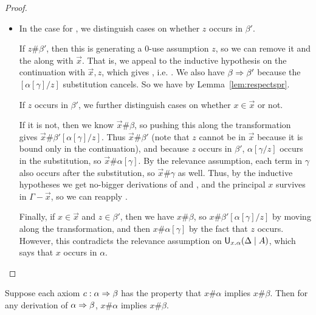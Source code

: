 \begin{proof}
\begin{itemize}
\item In the case for \UL, we distinguish cases on whether $z$ occurs in
  $\beta'$.  

  If $z \# \beta'$, then this \UL\/ is generating a 0-use assumption $z$, so
  we can remove it and the \UL\/ along with $\vec{x}$.  That is, we appeal
  to the inductive hypothesis on the continuation with $\vec{x},z$,
  which gives , i.e.
  .  We also have $\beta \Rightarrow \beta'$
  because the $[\alpha[\gamma]/z]$ substitution cancels.  So we have
   by Lemma~\ref{lem:respectspr}.
  
  If $z$ occurs in $\beta'$, we further distinguish cases on whether $x
  \in \vec{x}$ or not.  

  If it is not, then we know $\vec{x} \# \beta$, so pushing this along
  the transformation gives $\vec{x} \# \beta'[\alpha[\gamma]/z]$.  Thus
  $\vec{x} \# \beta'$ (note that $z$ cannot be in $\vec{x}$ because it
  is bound only in the continuation), and because $z$ occurs in
  $\beta'$, $\alpha[\gamma/z]$ occurs in the substitution, so $\vec{x}
  \# \alpha[\gamma]$.  By the relevance assumption, each term in
  $\gamma$ also occurs after the substitution, so $\vec{x} \# \gamma$ as
  well.  Thus, by the inductive hypotheses we get no-bigger derivations
  of  and
  , and the principal $x$ survives in
  $\Gamma-\vec{x}$, so we can reapply \UL.

  Finally, if $x \in \vec{x}$ and $z \in \beta'$, then we have $x \#
  \beta$, so $x \# \beta'[\alpha[\gamma]/z]$ by moving along the
  transformation, and then $x \# \alpha[\gamma]$ by the fact that $z$
  occurs.  However, this contradicts the relevance assumption on
  $\mathsf{U}_{x.\alpha}(\Delta \mid A)$, which says that $x$ occurs in $\alpha$.  
\end{itemize}

\end{proof}

\begin{lemma} \label{lem:spr-doesnt-introduce}
Suppose each axiom $c : \alpha \Rightarrow \beta$ has the property that $x \#
\alpha$ implies $x \# \beta$.  Then for any derivation of $\alpha \Rightarrow
\beta$, $x \# \alpha$ implies $x \# \beta$.
\end{lemma}

